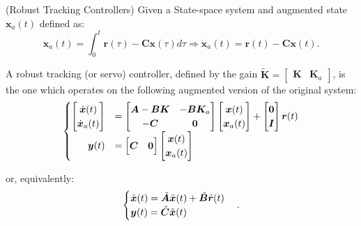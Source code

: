 \documentclass[a4paper,11pt]{book}
\numberwithin{figure}{chapter}
\numberwithin{equation}{chapter}
\numberwithin{table}{chapter}
\theoremstyle{definition}
\newtheorem{definition}{Definition}[chapter]
\newcounter{boxed-theorem}
\newcounter{boxed-definition}
\newenvironment{boxed-definition}[1]
{\begin{shaded} \begin{definition}{#1}}
{\end{definition} \end{shaded}}
\begin{document}
\begin{boxed-definition}{(Robust Tracking Controllers)} \label{def:robustTracking}
    Given a State-space system and augmented state $\bm{x}_a(t)$ defined as:
    \begin{equation}
        \bm{x}_a(t) = \int_{0}^{t} \bm{r}(\tau) - \bm{C} \bm{x}(\tau) d\tau \Longrightarrow \dot{\bm{x}}_a(t) = \bm{r}(t) - \bm{C} \bm{x}(t)
    .\end{equation}
    
    A robust tracking (or servo) controller, defined by the gain $\tilde{\bm{K}} = \begin{bmatrix} \bm{K} & \bm{K}_a \end{bmatrix}$, is the one which operates on the following augmented version of the original system:
    \begin{align} \label{eq:augmentedSystem}
    \begin{cases}
        \begin{bmatrix}
            \dot{\bm{x}}(t) \\
            \dot{\bm{x}}_a(t)
        \end{bmatrix} &= \begin{bmatrix}
            \bm{A} - \bm{B} \bm{K} & -\bm{B} \bm{K}_a \\ - \bm{C} & \bm{0}
        \end{bmatrix} \begin{bmatrix}
            \bm{x}(t) \\
            \bm{x}_a(t)
        \end{bmatrix} + \begin{bmatrix}
            \bm{0} \\
            \bm{I}
        \end{bmatrix} \bm{r}(t)
        \\
        \hfill \bm{y}(t) &= \begin{bmatrix}
            \bm{C} & \bm{0}
        \end{bmatrix} \begin{bmatrix}
            \bm{x}(t) \\
            \bm{x}_a(t)
        \end{bmatrix}
    \end{cases}
    \end{align}
    
    or, equivalently:
    \begin{align}
    \begin{cases}
        \tilde{\bm{x}}(t) = \tilde{\bm{A}} \tilde{\bm{x}}(t) + \tilde{\bm{B}} \tilde{\bm{r}}(t) \\
        \bm{y}(t) = \tilde{\bm{C}} \tilde{\bm{x}}(t) \hfill
    \end{cases}
    .\end{align}
\end{boxed-definition}
\end{document}

